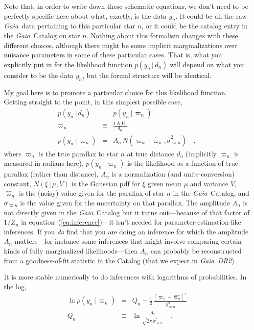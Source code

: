 \documentclass[12pt, modern]{aastex62h}
\newcommand{\acronym}[1]{{\small{#1}}}
\newcommand{\Gaia}{\textsl{Gaia}}
\newcommand{\DRtwo}{\textsl{\acronym{DR2}}}
\newcommand{\equationname}{equation}
\newcommand{\AU}{\mathrm{A.U.}}
\newcommand{\given}{\,|\,}
\begin{document}
Note that, in order to write down these schematic equations,
we don't need to be perfectly specific here about what, exactly,
is the data $y_n$.
It could be all the raw \Gaia\ data pertaining to this particular star $n$,
or it could be the catalog entry in the \Gaia\ Catalog on star $n$.
Nothing about this formalism changes with these different choices,
although there might be some implicit marginalizations over nuisance
parameters in some of these particular cases.
That is, what you explicitly put in for the likelihood function $p(y_n\given d_n)$
will depend on what you consider to be the data $y_n$, but the formal structure
will be identical.

My goal here is to promote a particular choice for this likelihood function.
Getting straight to the point, in this simplest possible case, 
\begin{eqnarray}
p(y_n\given d_n) &=& p(y_n\given\varpi_n)
\label{eq:gotoparallax}
\\
\varpi_n &\equiv& \frac{1\,\AU}{d_n}
\\
p(y_n\given\varpi_n) &=& A_n\,N(\varpi_n\given\hat{\varpi}_n,\hat{\sigma}^2_{\varpi n})
\label{eq:onedlike}
\quad ,
\end{eqnarray}
where
$\varpi_n$ is the true parallax to star $n$ at true distance $d_n$ (implicitly $\varpi_n$ is measured in radians here),
$p(y_n\given\varpi_n)$ is the likelihood as a function of true parallax (rather than distance),
$A_n$ is a normalization (and units-conversion) constant,
$N(\xi\given\mu,V)$ is the Gaussian pdf for $\xi$ given mean $\mu$ and variance $V$,
$\hat{\varpi}_n$ is the (noisy) value given for the parallax of star $n$ in the \Gaia\ Catalog,
and $\hat{\sigma}_{\varpi n}$ is the value given for the uncertainty on that parallax.
The amplitude $A_n$ is not directly given in the \Gaia\ Catalog
but it turns out---because of that factor of $1/Z_n$ in
\equationname~(\ref{eq:inference})---it isn't needed for parameter-estimation-like
inferences.
If you \emph{do} find that you are doing an inference for which the amplitude
$A_n$ matters---for instance some inferences that might involve comparing certain
kinds of fully marginalized likelihoods---then $A_n$ can probably be reconstructed
from a goodness-of-fit statistic in the Catalog (that we expect in \Gaia\ \DRtwo).

It is more stable numerically to do inferences with logarithms of probabilities.
In the log,
\begin{eqnarray}
\ln p(y_n\given\varpi_n) &=& Q_n - \frac{1}{2}\,\frac{[\varpi_n - \hat{\varpi_n}]^2}{\hat{\sigma}^2_{\varpi n}}
\label{eq:onedlikelog}
\\
Q_n &\equiv& \ln\frac{A_n}{\sqrt{2\pi\,\hat{\sigma}^2_{\varpi n}}}
\quad .
\end{eqnarray}
\end{document}
